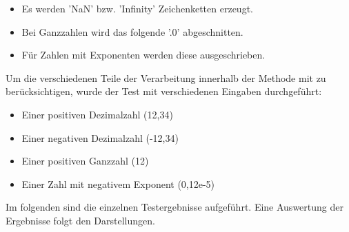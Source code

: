 \begin{itemize}
 	\item Es werden 'NaN' bzw. 'Infinity' Zeichenketten erzeugt.
 	\item Bei Ganzzahlen wird das folgende '.0' abgeschnitten.
 	\item Für Zahlen mit Exponenten werden diese ausgeschrieben.
\end{itemize} 

Um die verschiedenen Teile der Verarbeitung innerhalb der Methode mit zu berücksichtigen, 
wurde der Test mit verschiedenen Eingaben durchgeführt:

\begin{itemize}
	\item Einer positiven Dezimalzahl (12,34)
	\item Einer negativen Dezimalzahl (-12,34)
	\item Einer positiven Ganzzahl (12)
	\item Einer Zahl mit negativem Exponent (0,12e-5)
\end{itemize}

Im folgenden sind die einzelnen Testergebnisse aufgeführt. Eine Auswertung der
Ergebnisse folgt den Darstellungen.


